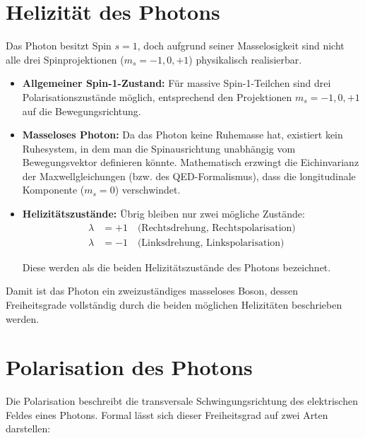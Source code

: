 \section{Helizität des Photons}
\label{anhangA:helizitaet}

Das Photon besitzt Spin $s=1$, doch aufgrund seiner Masselosigkeit sind nicht alle drei Spinprojektionen ($m_s=-1,0,+1$) physikalisch realisierbar. 

\begin{itemize}
	\item \textbf{Allgemeiner Spin-1-Zustand:}  
	Für massive Spin-1-Teilchen sind drei Polarisationszustände möglich, entsprechend den Projektionen $m_s=-1,0,+1$ auf die Bewegungsrichtung.
	
	\item \textbf{Masseloses Photon:}  
	Da das Photon keine Ruhemasse hat, existiert kein Ruhesystem, in dem man die Spinausrichtung unabhängig vom Bewegungsvektor definieren könnte.  
	Mathematisch erzwingt die Eichinvarianz der Maxwellgleichungen (bzw. des QED-Formalismus), dass die longitudinale Komponente ($m_s=0$) verschwindet.
	
	\item \textbf{Helizitätszustände:}  
	Übrig bleiben nur zwei mögliche Zustände:
	\begin{align*}
		\lambda& = +1 \quad \text{(Rechtsdrehung, Rechtspolarisation)}\\
		\lambda &= -1 \quad \text{(Linksdrehung, Linkspolarisation)}
	\end{align*}
	
	Diese werden als die beiden Helizitätszustände des Photons bezeichnet.
\end{itemize}

\noindent
Damit ist das Photon ein zweizuständiges masseloses Boson, dessen Freiheitsgrade vollständig durch die beiden möglichen Helizitäten beschrieben werden.

\section{Polarisation des Photons}
\label{anhangA:polarisation}

Die Polarisation beschreibt die transversale Schwingungsrichtung des elektrischen Feldes eines Photons. Formal lässt sich dieser Freiheitsgrad auf zwei Arten darstellen:


